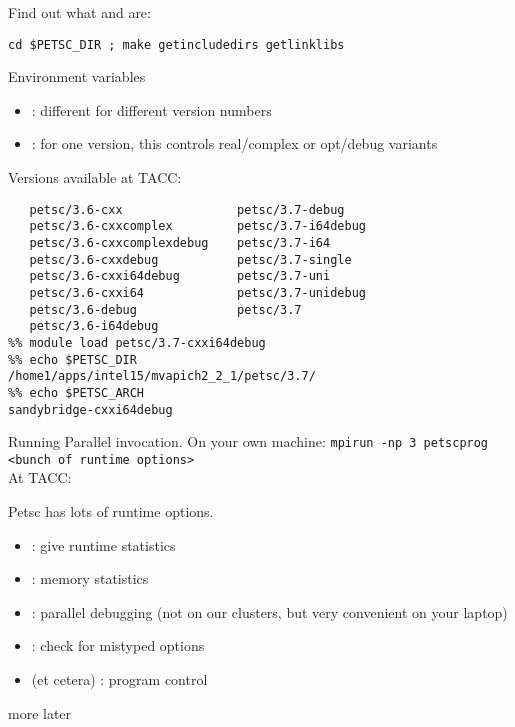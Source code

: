 \begin{longversion}
\begin{numberedframe}
Find out what  and  are:
\begin{verbatim}
cd $PETSC_DIR ; make getincludedirs getlinklibs
\end{verbatim}
\end{numberedframe}

\end{longversion}

\begin{numberedframe}{Environment variables}
\small
  \begin{itemize}
  \item {} : different for different version numbers
  \item {} : for one version, this controls real/complex
    or opt/debug variants
  \end{itemize}
Versions available at TACC: 
\begin{verbatim}
   petsc/3.6-cxx                petsc/3.7-debug
   petsc/3.6-cxxcomplex         petsc/3.7-i64debug
   petsc/3.6-cxxcomplexdebug    petsc/3.7-i64
   petsc/3.6-cxxdebug           petsc/3.7-single
   petsc/3.6-cxxi64debug        petsc/3.7-uni
   petsc/3.6-cxxi64             petsc/3.7-unidebug
   petsc/3.6-debug              petsc/3.7
   petsc/3.6-i64debug
%% module load petsc/3.7-cxxi64debug
%% echo $PETSC_DIR
/home1/apps/intel15/mvapich2_2_1/petsc/3.7/
%% echo $PETSC_ARCH
sandybridge-cxxi64debug
\end{verbatim}
\end{numberedframe}

\begin{numberedframe}{Running}
Parallel invocation. On your own machine:
\verb+mpirun -np 3 petscprog <bunch of runtime options>+\\
At TACC: 

Petsc has lots of runtime options.
\begin{itemize}
\item {} : give runtime statistics
\item {}  : memory statistics
\item {} : parallel debugging (not on our
  clusters, but very convenient on your laptop)
\item {} : check for mistyped options
\item {} (et cetera) : program control
\end{itemize}
more later
\end{numberedframe}

